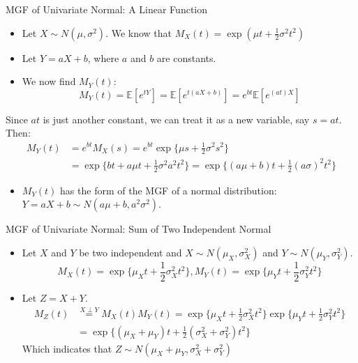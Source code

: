 \documentclass[
  ignorenonframetext,
]{beamer}
\providecommand{\tightlist}{%
  \setlength{\itemsep}{0pt}\setlength{\parskip}{0pt}}
\begin{document}
\begin{frame}{MGF of Univariate Normal: A Linear Function}
\protect\hypertarget{mgf-of-univariate-normal-a-linear-function}{}
\begin{itemize}
\item
  Let \(X\sim N(\mu, \sigma^2)\). We know that
  \(M_X(t) = \exp\left(\mu t + \frac{1}{2}\sigma^2 t^2\right)\)
\item
  Let \(Y = aX + b\), where \(a\) and \(b\) are constants.
\item
  We now find \(M_Y(t)\): \[
  M_Y(t) = \mathbb{E}[e^{tY}] = \mathbb{E}[e^{t(aX + b)}] = e^{bt} \mathbb{E}[e^{(at)X}]
  \]
\end{itemize}

Since \(at\) is just another constant, we can treat it as a new
variable, say \(s = at\). Then: \[
\begin{aligned}
M_Y(t) &= e^{bt} M_X(s) = e^{bt} \exp\{\mu s + \frac{1}{2}\sigma^2 s^2\} \\
&= \exp\{b t + a\mu t + \frac{1}{2}\sigma^2 a^2 t^2\}
= \exp\{(a\mu + b)t + \frac{1}{2}(a\sigma)^2 t^2\}
\end{aligned} 
\]

\begin{itemize}
\tightlist
\item
  \(M_Y(t)\) has the form of the MGF of a normal distribution:
  \(Y = aX + b\sim N(a\mu+b, a^2\sigma^2)\).
\end{itemize}
\end{frame}

\begin{frame}{MGF of Univariate Normal: Sum of Two Independent Normal}
\protect\hypertarget{mgf-of-univariate-normal-sum-of-two-independent-normal}{}
\begin{itemize}
\item
  Let \(X\) and \(Y\) be two independent and
  \(X\sim N(\mu_X, \sigma_X^2)\) and \(Y\sim N(\mu_Y, \sigma_Y^2)\).
  \[M_X(t) = \exp\{\mu_X t + \frac{1}{2}\sigma_X^2 t^2\},
   M_Y(t) = \exp\{\mu_Y t + \frac{1}{2}\sigma_Y^2 t^2\}\]
\item
  Let \(Z = X + Y\). \[
  \begin{aligned}
  M_Z(t) &\overset{X\perp Y}= M_X(t) M_Y(t) = \exp\{\mu_X t + \frac{1}{2}\sigma_X^2 t^2\} \exp\{\mu_Y t + \frac{1}{2}\sigma_Y^2 t^2\}\\
  &=\exp\{(\mu_X+\mu_Y) t + \frac{1}{2}(\sigma_X^2+\sigma_Y^2) t^2\}
  \end{aligned}
  \] Which indicates that
  \(Z\sim N(\mu_X+\mu_Y, \sigma_X^2+\sigma_Y^2)\)
\end{itemize}
\end{frame}
\end{document}
